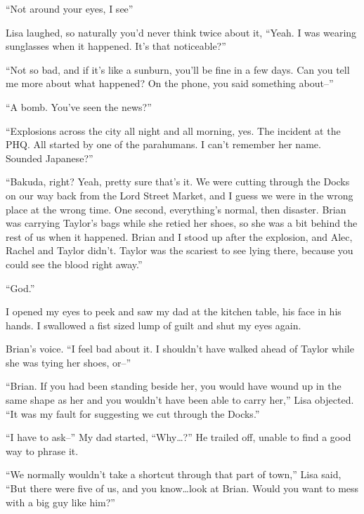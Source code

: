 ``Not around your eyes, I see''



Lisa laughed, so naturally you'd never think twice about it, ``Yeah.  I was wearing sunglasses when it happened.  It's that noticeable?''



``Not so bad, and if it's like a sunburn, you'll be fine in a few days.  Can you tell me more about what happened?  On the phone, you said something about--''



``A bomb.  You've seen the news?''



``Explosions across the city all night and all morning, yes.  The incident at the PHQ.   All started by one of the parahumans.  I can't remember her name.  Sounded Japanese?''



``Bakuda, right?  Yeah, pretty sure that's it.  We were cutting through the Docks on our way back from the Lord Street Market, and I guess we were in the wrong place at the wrong time.  One second, everything's normal, then disaster.  Brian was carrying Taylor's bags while she retied her shoes, so she was a bit behind the rest of us when it happened.  Brian and I stood up after the explosion, and Alec, Rachel and Taylor didn't.  Taylor was the scariest to see lying there, because you could see the blood right away.''



``God.''



I opened my eyes to peek and saw my dad at the kitchen table, his face in his hands.  I swallowed a fist sized lump of guilt and shut my eyes again.



Brian's voice.  ``I feel bad about it.  I shouldn't have walked ahead of Taylor while she was tying her shoes, or--''



``Brian.  If you had been standing beside her, you would have wound up in the same shape as her and you wouldn't have been able to carry her,'' Lisa objected. ``It was my fault for suggesting we cut through the Docks.''



``I have to ask--'' My dad started, ``Why\ldots?''  He trailed off, unable to find a good way to phrase it.



``We normally wouldn't take a shortcut through that part of town,'' Lisa said, ``But there were five of us, and you know\ldots look at Brian.  Would you want to mess with a big guy like him?''



